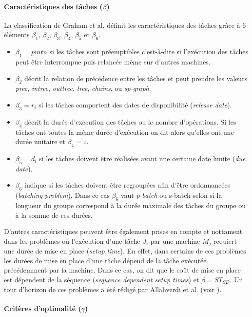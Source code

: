 \paragraph{Caractéristiques des tâches ($\beta$)}

La classification de Graham et al. définit les caractéristiques des tâches grâce à 6 éléments $\beta_1$, $\beta_2$, $\beta_3$, $\beta_4$, $\beta_5$ et $\beta_6$.
\begin{itemize}
 \item $\beta_1=pmtn$ si les tâches sont préemptibles c'est-à-dire si l'exécution des tâches peut être interrompue puis relancée même sur d'autres machines.
 \item $\beta_2$ décrit la relation de précédence entre les tâches et peut prendre les valeurs \textit{prec}, \textit{intree}, \textit{outtree}, \textit{tree}, \textit{chains}, ou \textit{sp-graph}.
 \item $\beta_3 = r_i$ si les tâches comportent des dates de disponibilité (\textit{release date}).
 \item $\beta_4$ décrit la durée d'exécution des tâches ou le nombre d'opérations. Si les tâches ont toutes la même durée d'exécution on dit alors qu'elles ont une durée unitaire et $\beta_4=1$.
 \item $\beta_5= d_i$ si les tâches doivent être réalisées avant une certaine date limite (\textit{due date}).
 \item $\beta_6$ indique si les tâches doivent être regroupées afin d'être ordonnancées (\textit{batching problem}). Dans ce cas $\beta_6$ vaut \textit{p-batch} ou {s-batch} selon si la longueur du groupe correspond à la durée maximale des tâches du groupe ou à la somme de ces durées.
\end{itemize}
D'autres caractéristiques peuvent être également prises en compte et nottament dans les problèmes où l'exécution d'une tâche $J_i$ par une machine $M_j$ requiert une durée de mise en place (\textit{setup time}). En effet, dans certains de ces problèmes les durées de mise en place d'une tâche dépend de la tâche exécutée précédemment par la machine. Dans ce cas, on dit que le coût de mise en place est dépendent de la séquence (\textit{sequence dependent setup times}) et $\beta = ST_{SD}$. Un tour d'horizon de ces problèmes a été rédigé par Allahverdi et al. (voir \cite{Allahverdi1999}).

\paragraph{Critères d'optimalité ($\gamma$)}


